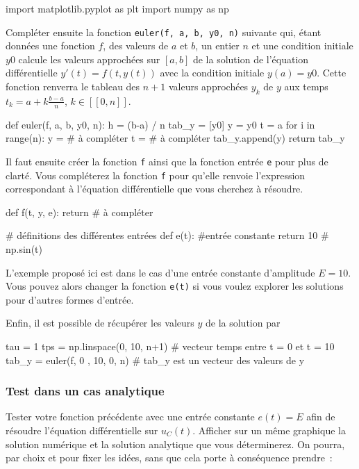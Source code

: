 \documentclass[a4paper, 11pt, final, garamond]{book}
\begin{document}
\begin{python}
import matplotlib.pyplot as plt
import numpy as np
\end{python}

Compléter ensuite la fonction \texttt{euler(f, a, b, y0, n)} suivante qui, étant
données une fonction $f$, des valeurs de $a$ et $b$, un entier $n$ et une
condition initiale $y0$ calcule les valeurs approchées sur $[a,b]$ de la
solution de l'équation différentielle $y'(t)=f(t,y(t))$ avec la condition
initiale $y(a)=y0$. Cette fonction renverra le tableau des $n+1$ valeurs
approchées $y_k$ de $y$ aux temps $t_k=a+k \frac{b-a}{n}$, $k\in[\![0,n]\!]$.

\begin{python}
def euler(f, a, b, y0, n):
    h = (b-a) / n
    tab_y = [y0]
    y = y0
    t = a
    for i in range(n):
        y = # à compléter
        t = # à compléter
        tab_y.append(y)
    return tab_y
\end{python}

Il faut ensuite créer la fonction \texttt{f} ainsi que la fonction entrée
\texttt{e} pour plus de clarté. Vous compléterez la fonction \texttt{f} pour
qu'elle renvoie l'expression correspondant à l'équation différentielle que vous
cherchez à résoudre.

\begin{python}
def f(t, y, e):
    return # à compléter

# définitions des différentes entrées
def e(t): #entrée constante
    return 10 # np.sin(t)
\end{python}

L'exemple proposé ici est dans le cas d'une entrée constante d'amplitude $E =
10$. Vous pouvez alors changer la fonction \texttt{e(t)} si vous voulez explorer
les solutions pour d'autres formes d'entrée.

Enfin, il est possible de récupérer les valeurs $y$ de la solution par

\begin{python}
tau = 1
tps = np.linspace(0, 10, n+1) # vecteur temps entre t = 0 et t = 10
tab_y = euler(f, 0 , 10, 0, n) # tab_y est un vecteur des valeurs de y
\end{python}

\subsubsection{Test dans un cas analytique}

Tester votre fonction précédente avec une entrée constante $e(t) = E$ afin de
résoudre l'équation différentielle sur $u_{C}(t)$. Afficher sur un même
graphique la solution numérique et la solution analytique que vous déterminerez.
On pourra, par choix et pour fixer les idées, sans que cela porte à conséquence
prendre~:
\end{document}
